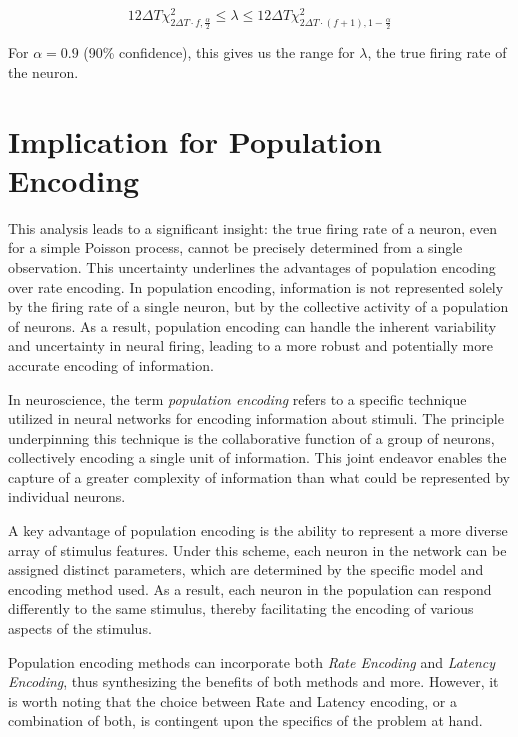 \begin{equation}
12\Delta T \chi^{2}_{2\Delta T \cdot f, \frac{\alpha}{2}} \leq \lambda \leq 12 \Delta T \chi^{2}_{2\Delta T \cdot (f+1), 1-\frac{\alpha}{2}}
\end{equation}

For $\alpha = 0.9$ (90\% confidence), this gives us the range for $\lambda$, the true firing rate of the neuron.

\section{Implication for Population Encoding}

This analysis leads to a significant insight: the true firing rate of a neuron, even for a simple Poisson process, cannot be precisely determined from a single observation. This uncertainty underlines the advantages of population encoding over rate encoding. In population encoding, information is not represented solely by the firing rate of a single neuron, but by the collective activity of a population of neurons. As a result, population encoding can handle the inherent variability and uncertainty in neural firing, leading to a more robust and potentially more accurate encoding of information.


In neuroscience, the term \textit{population encoding} refers to a specific technique utilized in neural networks for encoding information about stimuli. The principle underpinning this technique is the collaborative function of a group of neurons, collectively encoding a single unit of information. This joint endeavor enables the capture of a greater complexity of information than what could be represented by individual neurons.

A key advantage of population encoding is the ability to represent a more diverse array of stimulus features. Under this scheme, each neuron in the network can be assigned distinct parameters, which are determined by the specific model and encoding method used. As a result, each neuron in the population can respond differently to the same stimulus, thereby facilitating the encoding of various aspects of the stimulus.

Population encoding methods can incorporate both \textit{Rate Encoding} and \textit{Latency Encoding}, thus synthesizing the benefits of both methods and more. However, it is worth noting that the choice between Rate and Latency encoding, or a combination of both, is contingent upon the specifics of the problem at hand.

